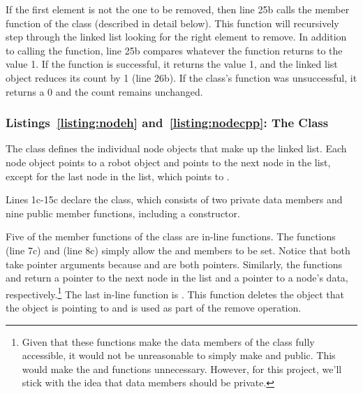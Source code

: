 If the first element is not the one to be removed, then line 25b calls the  member function of the  class (described in detail below).  This function will recursively step through the linked list looking for the right element to remove.   In addition to calling the  function, line 25b compares whatever the function returns to the value 1.  If the  function is successful, it returns the value 1, and the linked list object reduces its count by 1 (line 26b).  If the  class's  function was unsuccessful, it returns a 0 and the count remains unchanged.

\subsubsection{Listings~\ref{listing:nodeh} and~\ref{listing:nodecpp}: The  Class}

The  class defines the individual node objects that make up the linked list.  Each node object points to a robot object and points to the next node in the list, except for the last node in the list, which points to .


Lines 1c-15c declare the  class, which consists of two private data members and nine public member functions, including a constructor.  

Five of the member functions of the  class are in-line functions.  The functions   (line 7c) and  (line 8c) simply allow the  and  members to be set.  Notice that both take pointer arguments because  and  are both pointers.  Similarly, the functions  and  return a pointer to the next node in the list and a pointer to a node's data, respectively.\footnote{Given that these functions make the data members of the  class fully accessible, it would not be unreasonable to simply make  and  public.  This would make the  and  functions unnecessary.  However, for this project, we'll stick with the idea that data members should be private.}  The last in-line function is .  This function deletes the  object that the  object is pointing to and is used as part of the remove operation.

